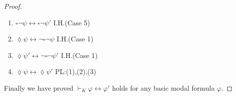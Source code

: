 \documentclass{article}
\begin{document}
\begin{proof}
\begin{enumerate}[{Case} 1: ]
	\begin{enumerate}[(1)]
		\item $\square \neg \psi \leftrightarrow \square \neg \psi'$ \hfill I.H.(Case 5)
		\item $\lozenge \psi \leftrightarrow \neg \square \neg \psi$ \hfill I.H.(Case 1)
		\item $\lozenge \psi' \leftrightarrow \neg \square \neg \psi'$ \hfill I.H.(Case 1)
		\item $\lozenge \psi \leftrightarrow \lozenge \psi'$ \hfill PL:(1),(2),(3)
	\end{enumerate}
	\end{enumerate}
	
	Finally we have proved $\vdash_K \varphi \leftrightarrow \varphi'$ holds for any basic modal formula $\varphi$. 
\end{proof}

%
\end{document}
